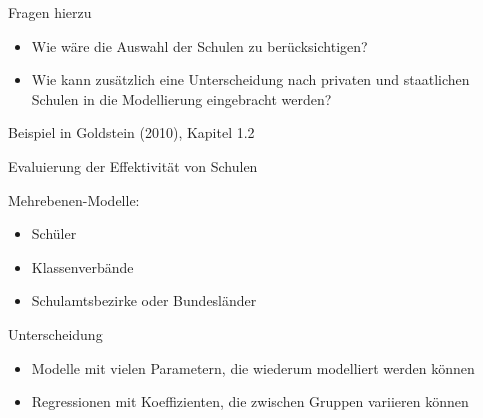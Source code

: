 \documentclass[ignorenonframetext,]{beamer}
\providecommand{\tightlist}{%
\setlength{\itemsep}{0pt}\setlength{\parskip}{0pt}}
\begin{document}
\begin{frame}{Fragen hierzu}

\begin{itemize}
\item
  Wie wäre die Auswahl der Schulen zu berücksichtigen?
\item
  Wie kann zusätzlich eine Unterscheidung nach privaten und staatlichen
  Schulen in die Modellierung eingebracht werden?
\end{itemize}

\end{frame}

\begin{frame}{Beispiel in Goldstein (2010), Kapitel 1.2}

Evaluierung der Effektivität von Schulen

Mehrebenen-Modelle:

\begin{itemize}
\tightlist
\item
  Schüler
\item
  Klassenverbände
\item
  Schulamtsbezirke oder Bundesländer
\end{itemize}

Unterscheidung

\begin{itemize}
\tightlist
\item
  Modelle mit vielen Parametern, die wiederum modelliert werden können
\item
  Regressionen mit Koeffizienten, die zwischen Gruppen variieren können
\end{itemize}

\end{frame}
\end{document}

